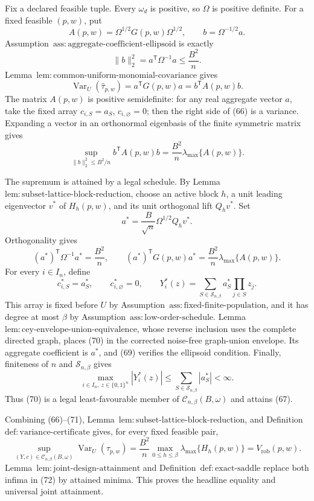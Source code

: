 Fix a declared feasible tuple.  Every \(\omega_d\) is positive, so \(\Omega\) is positive definite.  For a fixed feasible \((p,w)\), put
\[
A(p,w)=\Omega^{1/2}G(p,w)\Omega^{1/2},
\qquad b=\Omega^{-1/2}a.
\]
Assumption~\(\mathrm{ass{:}aggregate\text{-}coefficient\text{-}ellipsoid}\) is exactly
\[
\|b\|_2^2=a^{\mathsf T}\Omega^{-1}a\le\frac{B^2}{n}.
\tag{65}
\]
Lemma~\(\mathrm{lem{:}common\text{-}uniform\text{-}monomial\text{-}covariance}\) gives
\[
\operatorname{Var}_U(\widehat\tau_{p,w})
=a^{\mathsf T}G(p,w)a=b^{\mathsf T}A(p,w)b.
\tag{66}
\]
The matrix \(A(p,w)\) is positive semidefinite: for any real aggregate vector \(a\), take the fixed array \(c_{i,S}=a_S\), \(c_{i,\varnothing}=0\); then the right side of (66) is a variance.  Expanding a vector in an orthonormal eigenbasis of the finite symmetric matrix gives
\[
\sup_{\|b\|_2^2\le B^2/n}b^{\mathsf T}A(p,w)b
=\frac{B^2}{n}\lambda_{\max}\{A(p,w)\}.
\tag{67}
\]

The supremum is attained by a legal schedule.  By Lemma~\(\mathrm{lem{:}subset\text{-}lattice\text{-}block\text{-}reduction}\), choose an active block \(h\), a unit leading eigenvector \(v^*\) of \(H_h(p,w)\), and its unit orthogonal lift \(Q_hv^*\).  Set
\[
a^*=\frac B{\sqrt n}\Omega^{1/2}Q_hv^*.
\tag{68}
\]
Orthogonality gives
\[
(a^*)^{\mathsf T}\Omega^{-1}a^*=\frac{B^2}{n},
\qquad
(a^*)^{\mathsf T}G(p,w)a^*
=\frac{B^2}{n}\lambda_{\max}\{A(p,w)\}.
\tag{69}
\]
For every \(i\in I_n\), define
\[
c^*_{i,S}=a^*_S,
\qquad c^*_{i,\varnothing}=0,
\qquad
Y_i^*(z)=\sum_{S\in\mathcal S_{n,\beta}}a^*_S\prod_{j\in S}z_j.
\tag{70}
\]
This array is fixed before \(U\) by Assumption~\(\mathrm{ass{:}fixed\text{-}finite\text{-}population}\), and it has degree at most \(\beta\) by Assumption~\(\mathrm{ass{:}low\text{-}order\text{-}schedule}\).  Lemma~\(\mathrm{lem{:}cey\text{-}envelope\text{-}union\text{-}equivalence}\), whose reverse inclusion uses the complete directed graph, places (70) in the corrected noise-free graph-union envelope.  Its aggregate coefficient is \(a^*\), and (69) verifies the ellipsoid condition.  Finally, finiteness of \(n\) and \(\mathcal S_{n,\beta}\) gives
\[
\max_{i\in I_n,\ z\in\{0,1\}^n}|Y_i^*(z)|
\le\sum_{S\in\mathcal S_{n,\beta}}|a_S^*|<\infty.
\tag{71}
\]
Thus (70) is a legal least-favourable member of \(\mathcal C_{n,\beta}(B,\omega)\) and attains (67).

Combining (66)--(71), Lemma~\(\mathrm{lem{:}subset\text{-}lattice\text{-}block\text{-}reduction}\), and Definition~\(\mathrm{def{:}variance\text{-}certificate}\) gives, for every fixed feasible pair,
\[
\sup_{(Y,c)\in\mathcal C_{n,\beta}(B,\omega)}
\operatorname{Var}_U(\widehat\tau_{p,w})
=\frac{B^2}{n}\max_{0\le h\le\beta}\lambda_{\max}\{H_h(p,w)\}
=V_{\mathrm{rob}}(p,w).
\tag{72}
\]
Lemma~\(\mathrm{lem{:}joint\text{-}design\text{-}attainment}\) and Definition~\(\mathrm{def{:}exact\text{-}saddle}\) replace both infima in (72) by attained minima.  This proves the headline equality and universal joint attainment.


